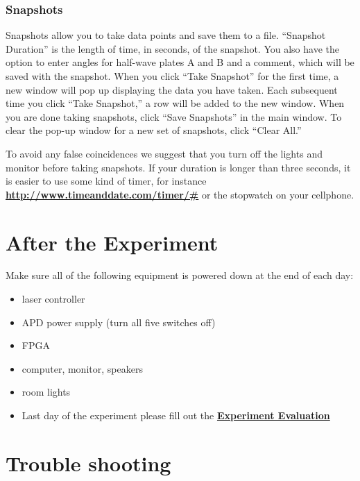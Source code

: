 \documentclass{../lab}
\begin{document}
\subsubsection{Snapshots}

Snapshots allow you to take data points and save them to a file. ``Snapshot Duration'' is the length of time, in seconds, of the snapshot. You also have the option to enter angles for half-wave plates A and B and a comment, which will be saved with the snapshot. When you click ``Take Snapshot'' for the first time, a new window will pop up displaying the data you have taken. Each subsequent time you click ``Take Snapshot,'' a row will be added to the new window. When you are done taking snapshots, click ``Save Snapshots'' in the main window. To clear the pop-up window for a new set of snapshots, click ``Clear All.''

To avoid any false coincidences we suggest that you turn off the lights and monitor before taking snapshots. If your duration is longer than three seconds, it is easier to use some kind of timer, for instance \href{http://www.timeanddate.com/timer/#}{\textbf{http://www.timeanddate.com/timer/\#}} or the stopwatch on your cellphone.


\section{After the Experiment}

Make sure all of the following equipment is powered down at the end of each day:

\begin{itemize}
    \item laser controller

    \item APD power supply (turn all five switches off)

    \item FPGA

    \item computer, monitor, speakers

    \item room lights

    \item Last day of the experiment please fill out the \href{\ExperimentEvaluation}{\textbf{Experiment Evaluation}}

\end{itemize}


\section{Trouble shooting}
\end{document}
